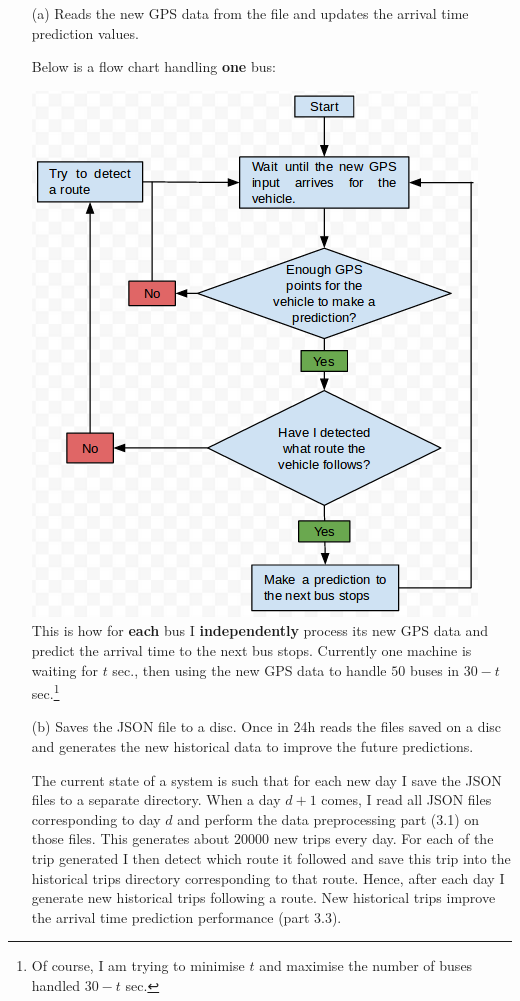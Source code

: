 \documentclass[12pt,a4paper,oneside,openright]{report}
\begin{document}
\begin{enumerate}

\item[(a)] Reads the new GPS data from the file and updates the arrival time
prediction values.

Below is a flow chart handling
\textbf{one} bus:

\includegraphics[scale = 0.6]{figs/flowchart.png} \\

This is how for \textbf{each} bus I \textbf{independently} process its new GPS data
and predict the arrival time to the next bus stops. Currently one machine is
waiting for $t$ sec., then using the new GPS data to handle $50$ buses in 
$30 - t$ sec.\footnote{Of course, I am trying to minimise $t$ and maximise the number of buses
handled $30 - t$ sec.}

\item[(b)] Saves the JSON file to a disc. Once in 24h reads the files saved on a disc
and generates the new historical data to improve the future predictions.

The current state of a system is such that for each new day I save the JSON files
to a separate directory. When a day $d+1$ comes, I read all JSON files corresponding
to day $d$ and perform the data preprocessing part (3.1) on those files. This generates
about $20000$ new trips every day. For each of the trip generated I then detect
which route it followed and save this trip into the historical trips directory
corresponding to that route. Hence, after each day I generate new historical trips
following a route. New historical trips improve the arrival time prediction
performance (part 3.3).

\end{enumerate}
\end{document}

